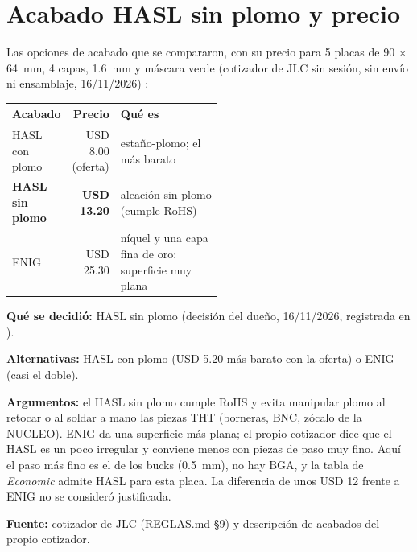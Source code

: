 \section{Acabado HASL sin plomo y precio}\label{sec:c06-acabado}

Las opciones de acabado que se compararon, con su precio para 5 placas de \num{90} $\times$
\SI{64}{\milli\meter}, 4 capas, \SI{1.6}{\milli\meter} y máscara verde (cotizador de JLC sin sesión, sin envío ni
ensamblaje, 16/11/2026) :

\begin{center}
\begin{tabular}{@{}lrL{0.52\linewidth}@{}}
\toprule
\textbf{Acabado} & \textbf{Precio} & \textbf{Qué es}\\
\midrule
HASL con plomo & USD 8.00 (oferta) & estaño-plomo; el más barato\\
\textbf{HASL sin plomo} & \textbf{USD 13.20} & aleación sin plomo (cumple RoHS)\\
ENIG & USD 25.30 & níquel y una capa fina de oro: superficie muy plana\\
\bottomrule
\end{tabular}
\end{center}

\begin{decision}
\textbf{Qué se decidió:} HASL sin plomo (decisión del dueño, 16/11/2026, registrada en
).

\textbf{Alternativas:} HASL con plomo (USD 5.20 más barato con la oferta) o ENIG (casi el doble).

\textbf{Argumentos:} el HASL sin plomo cumple RoHS y evita manipular plomo al retocar o al soldar a mano las piezas
THT (borneras, BNC, zócalo de la NUCLEO). ENIG da una superficie más plana; el propio cotizador dice que el HASL es un
poco irregular y conviene menos con piezas de paso muy fino. Aquí el paso más fino es el de los bucks
(\SI{0.5}{\milli\meter}), no hay BGA, y la tabla de \emph{Economic} admite HASL para esta placa. La diferencia de unos
USD 12 frente a ENIG no se consideró justificada.

\textbf{Fuente:} cotizador de JLC (REGLAS.md §9) y descripción de acabados del propio cotizador.
\end{decision}

